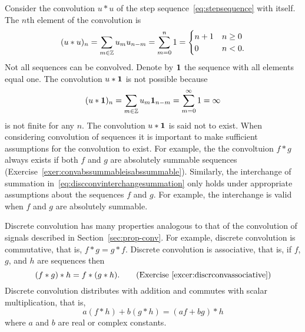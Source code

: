 Consider the convolution $u * u$ of the step sequence~\eqref{eq:stepsequence} with itself.  The $n$th element of the convolution is
\[
(u * u)_n = \sum_{m \in {\mathbb Z}} u_m u_{n-m} = \sum_{m = 0}^n 1 = \begin{cases}
n+1 & n \geq 0 \\
0 & n < 0.
\end{cases}
\] 
Not all sequences can be convolved.  Denote by $\mathbf{1}$ the sequence with all elements equal one.  The convolution $u * \mathbf{1}$ is not possible because
\[
(u * \mathbf{1})_n =  \sum_{m \in {\mathbb Z}} u_m \mathbf{1}_{n-m} = \sum_{m = 0}^\infty 1 = \infty
\]
is not finite for any $n$.  The convolution $u * \mathbf{1}$ is said not to exist.  When considering convolution of sequences it is important to make sufficient assumptions for the convolution to exist.  For example, the the convoltuion $f * g$ always exists if both $f$ and $g$ are absolutely summable sequences (Exercise~\ref{exer:convabssummableisabssummable}).  Similarly, the interchange of summation in~\eqref{eq:discconvinterchangesummation} only holds under appropriate assumptions about the sequences $f$ and $g$.  For example, the interchange is valid when $f$ and $g$ are absolutely summable.

Discrete convolution has many properties analogous to that of the convolution of signals described in Section~\ref{sec:prop-conv}.  For example, discrete convolution is commutative, that is, $f * g = g * f$.  Discrete convolution is associative, that is, if $f$, $g$, and $h$ are sequences then
\[
(f*g)*h = f*(g*h). \qquad \text{(Exercise~\ref{excer:discrconvassociative})}
\] 
Discrete convolution distributes with addition and commutes with scalar multiplication, that is,
\[
a (f * h) + b (g * h) = (af + bg) * h
\]
where $a$ and $b$ are real or complex constants.  




